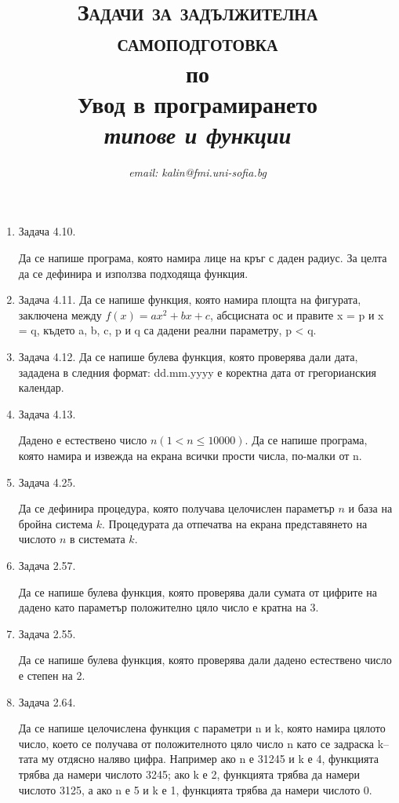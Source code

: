 \documentclass[12pt,a4paper]{article}
\author{\textit{email: kalin@fmi.uni-sofia.bg}}
\title{\textsc{Задачи за задължителна самоподготовка} \\
по \\
Увод в програмирането\\
\textit{типове и функции}}
\begin{document}
\maketitle


\begin{enumerate}
	\item Задача 4.10.

	Да се напише програма, която намира лице на кръг с даден радиус. За целта да се дефинира и използва подходяща функция.

	\item Задача 4.11. Да се напише функция, която намира площта на фигурата, заключена между $f(x) = ax^2 + bx + c$, абсцисната ос и правите x = p и x = q, където a, b, c, p и q са дадени реални параметру, p < q.

	\item Задача 4.12. Да се напише булева функция, която проверява дали дата, зададена в следния формат: dd.mm.yyyy е коректна дата от грегорианския календар. 

	\item Задача 4.13. 

	Дадено е естествено число $n (1 < n \leq 10000)$. Да се напише програма, която намира и извежда на екрана всички  прости числа, по-малки от n.

	\item Задача 4.25. 

	Да се дефинира процедура, която получава целочислен параметър $n$ и база на бройна система $k$. Процедурата да отпечатва на екрана представянето на числото $n$ в системата $k$.

\item Задача 2.57. 

Да се напише булева функция, която проверява дали сумата от цифрите на дадено като параметър положително цяло число е кратна на 3.

\item Задача 2.55. 

Да се напише булева функция, която проверява дали дадено естествено число е степен на 2.

\item Задача 2.64. 

Да се напише целочислена функция с параметри n и k, която намира цялото число, което се получава от положителното цяло число n като се задраска k–тата му отдясно наляво цифра. Например ако n е 31245 и k е 4, функцията трябва да намери числото 3245; ако k е 2, функцията трябва да намери числото 3125, а ако n е 5 и k е 1, функцията трябва да намери числото 0.


\end{enumerate}
\end{document}
